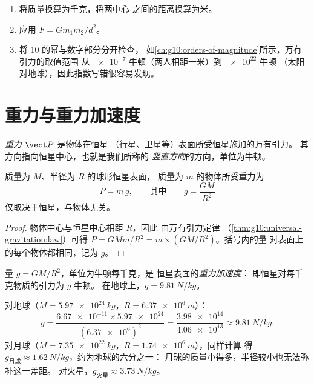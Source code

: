 \begin{method}[计算万有引力]\label{met:g10:universal-gravitation:compute}
\begin{enumerate}
  \item 将质量换算为千克，将两中心
        之间的距离换算为米。
  \item 应用 $F = G m_1 m_2 / d^2$。
  \item 将 10 的幂与数字部分分开检查，
        如\cref{ch:g10:orders-of-magnitude}所示，万有引力的取值范围
        从 $\num{e-7}$ 牛顿（两人相距一米）到 $\num{e22}$ 牛顿
        （太阳对地球），因此指数写错很容易发现。
\end{enumerate}
\end{method}

\section{重力与重力加速度}

\begin{definition}[重力]\label{def:g10:universal-gravitation:weight}
\emph{重力} $\vect P$ 是物体在恒星
（行星、卫星等）表面所受恒星施加的万有引力。
其方向指向恒星中心，也就是我们所称的
\emph{竖直方向}的方向，单位为牛顿。
\end{definition}

\begin{proposition}[恒星表面的重力]\label{prop:g10:universal-gravitation:surfaceg}
质量为 $M$、半径为 $R$ 的球形恒星表面，
质量为 $m$ 的物体所受重力为
\[
P = m\,g,
\qquad\text{其中}\qquad
g = \frac{G M}{R^2}
\]
仅取决于恒星，与物体无关。
\end{proposition}

\begin{proof}
物体中心与恒星中心相距 $R$，因此
由万有引力定律
（\cref{thm:g10:universal-gravitation:law}）可得
$P = G M m / R^2 = m \times \left(G M / R^2\right)$。括号内的量
对表面上的每个物体都相同，记为 $g$。
\end{proof}

\begin{definition}[重力加速度]\label{def:g10:universal-gravitation:fieldstrength}
量 $g = G M / R^2$，单位为牛顿每千克，是
恒星表面的\emph{重力加速度}：
即恒星对每千克物质的引力为 $g$ 牛顿。
在地球上，$g = \qty{9.81}{N/kg}$。
\end{definition}

\begin{example}[计算 $g$]\label{ex:g10:universal-gravitation:gvalues}
对地球（$M = \qty{5.97e24}{kg}$，$R = \qty{6.37e6}{m}$）：
\[
g = \frac{\num{6.67e-11} \times \num{5.97e24}}{(\num{6.37e6})^2}
= \frac{\num{3.98e14}}{\num{4.06e13}}
\approx \qty{9.81}{N/kg}.
\]
对月球（$M = \qty{7.35e22}{kg}$，$R = \qty{1.74e6}{m}$），同样计算
得 $g_{\text{月球}} \approx \qty{1.62}{N/kg}$，约为地球的六分之一：
月球的质量小得多，半径较小也无法弥补这一差距。
对火星，$g_{\text{火星}} \approx \qty{3.73}{N/kg}$。
\end{example}

